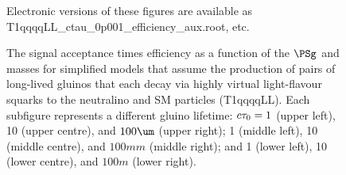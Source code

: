 \begin{figure}
\begin{center}
  \caption{ The signal acceptance times efficiency as a function of 
	    the $\PSg$ and \PSGczDo
    masses for simplified models that assume the production of pairs
    of long-lived gluinos that each decay via highly virtual
    light-flavour squarks to the neutralino and SM particles
    (T1qqqqLL). 
	    Each subfigure represents a different gluino lifetime:
    $\ctau = 1$ (upper left), 10 (upper centre), and $100\um$ (upper
    right); 1 (middle left), 10 (middle centre), and $100\unit{mm}$
    (middle right); and 1 (lower left), 10 (lower centre), and
    $100\unit{m}$ (lower right).}
    Electronic versions of these figures are available as T1qqqqLL\_ctau\_0p001\_efficiency\_aux.root, etc.
        \label{fig:T1qqqqLL_eff}
    \end{center}
\end{figure}


